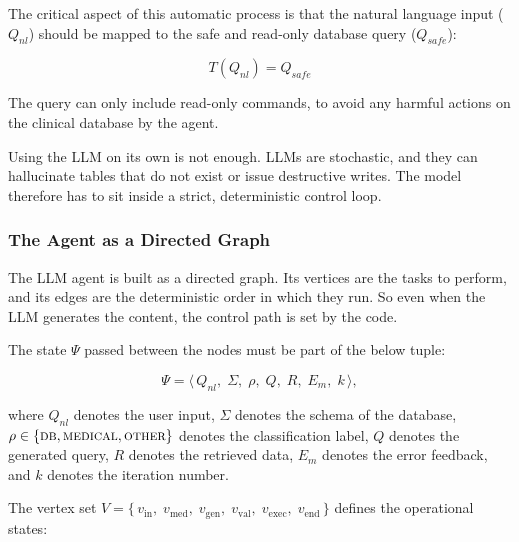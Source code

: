 The critical aspect of this automatic process is that the natural language input ($Q_{nl}$) should be mapped to the safe and read-only database query ($Q_{safe}$):

\begin{equation}
    T(Q_{nl}) = Q_{safe}
    \label{eq:translation}
\end{equation}

The query can only include read-only commands, to avoid any harmful actions on the clinical database by the agent.

Using the LLM on its own is not enough. LLMs are stochastic, and they can hallucinate tables that do not exist or issue destructive writes. The model therefore has to sit inside a strict, deterministic control loop.

\subsubsection*{The Agent as a Directed Graph}

The LLM agent is built as a directed graph. Its vertices are the tasks to perform, and its edges are the deterministic order in which they run. So even when the LLM generates the content, the control path is set by the code.

\vspace{1em}

The state $\Psi$ passed between the nodes must be part of the below tuple:

\begin{equation}
    \Psi = \langle\, Q_{nl},\; \Sigma,\; \rho,\; Q,\; R,\; E_m,\; k \,\rangle,
    \label{eq:state}
\end{equation}

where $Q_{nl}$ denotes the user input, $\Sigma$ denotes the schema of the database, $\rho \in \{\textsc{db}, \textsc{medical}, \textsc{other}\}$ denotes the classification label, $Q$ denotes the generated query, $R$ denotes the retrieved data, $E_m$ denotes the error feedback, and $k$ denotes the iteration number.

The vertex set $V = \{\, v_{\mathrm{in}},\; v_{\mathrm{med}},\; v_{\mathrm{gen}},\; v_{\mathrm{val}},\; v_{\mathrm{exec}},\; v_{\mathrm{end}} \,\}$ defines the operational states:


